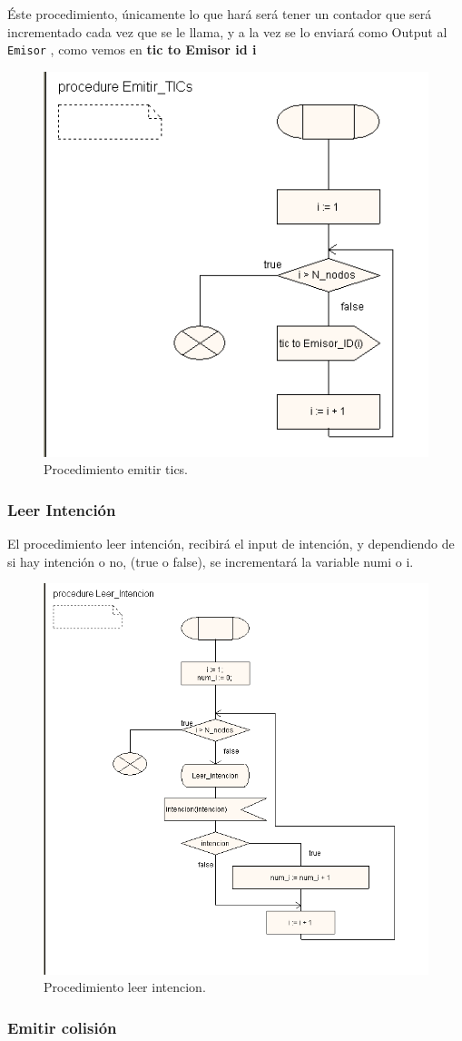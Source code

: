 \documentclass{article}
\begin{document}
Éste procedimiento, únicamente lo que hará será tener un contador que será  incrementado cada vez que se le llama, y a la vez se lo enviará como Output al \verb|Emisor| , como vemos en \textbf{tic to Emisor id i}

\begin{figure}[hbt]
    \centering
    \includegraphics[width=0.3\linewidth]{src/proc emitir tics.png}
    \caption{\label{fig:emitirtics} Procedimiento emitir tics.}
\end{figure}

\subsubsection{Leer Intención}

El procedimiento leer intención, recibirá el input de intención, y dependiendo de si hay intención o no, (true o false), se incrementará la variable numi o i.

\quad

\begin{figure}[h]
    \centering
    \includegraphics[width=0.6\linewidth]{src/leer intencion.png}
    \caption{\label{fig:leerintencion} Procedimiento leer intencion.}
\end{figure}

\subsubsection{Emitir colisión}
\end{document}
